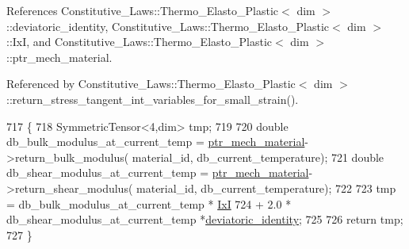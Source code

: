 References Constitutive\+\_\+\+Laws\+::\+Thermo\+\_\+\+Elasto\+\_\+\+Plastic$<$ dim $>$\+::deviatoric\+\_\+identity, Constitutive\+\_\+\+Laws\+::\+Thermo\+\_\+\+Elasto\+\_\+\+Plastic$<$ dim $>$\+::\+IxI, and Constitutive\+\_\+\+Laws\+::\+Thermo\+\_\+\+Elasto\+\_\+\+Plastic$<$ dim $>$\+::ptr\+\_\+mech\+\_\+material.



Referenced by Constitutive\+\_\+\+Laws\+::\+Thermo\+\_\+\+Elasto\+\_\+\+Plastic$<$ dim $>$\+::return\+\_\+stress\+\_\+tangent\+\_\+int\+\_\+variables\+\_\+for\+\_\+small\+\_\+strain().


\begin{DoxyCode}
717                                                                                                    \{
718         SymmetricTensor<4,dim> tmp;
719 
720         \textcolor{keywordtype}{double} db\_bulk\_modulus\_at\_current\_temp = \hyperlink{classConstitutive__Laws_1_1Thermo__Elasto__Plastic_a5a59fd71829d58859a122fe74628a9e4}{ptr\_mech\_material}->return\_bulk\_modulus(
      material\_id, db\_current\_temperature);
721         \textcolor{keywordtype}{double} db\_shear\_modulus\_at\_current\_temp = \hyperlink{classConstitutive__Laws_1_1Thermo__Elasto__Plastic_a5a59fd71829d58859a122fe74628a9e4}{ptr\_mech\_material}->return\_shear\_modulus(
      material\_id, db\_current\_temperature);
722 
723         tmp =     db\_bulk\_modulus\_at\_current\_temp * \hyperlink{classConstitutive__Laws_1_1Thermo__Elasto__Plastic_a3e093ae5b5ef432f1f4fea14148dd8e1}{IxI}
724                    + 2.0 * db\_shear\_modulus\_at\_current\_temp *\hyperlink{classConstitutive__Laws_1_1Thermo__Elasto__Plastic_a5d88bd28aa5b3e74707ebb49de884755}{deviatoric\_identity};
725 
726         \textcolor{keywordflow}{return} tmp;
727     \}
\end{DoxyCode}

